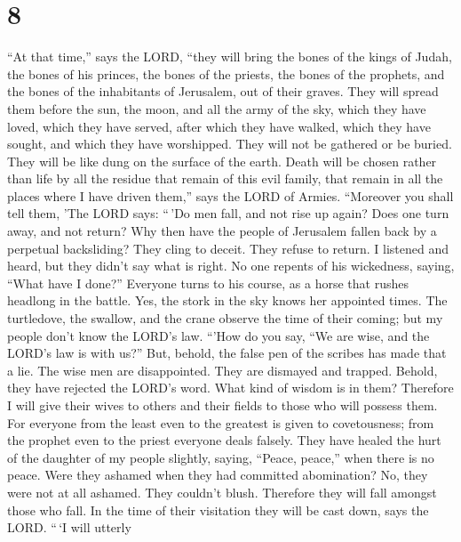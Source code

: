 \hypertarget{section-7}{%
\section{8}\label{section-7}}

 ``At that time,'' says the LORD, ``they will bring the
bones of the kings of Judah, the bones of his princes, the bones of the
priests, the bones of the prophets, and the bones of the inhabitants of
Jerusalem, out of their graves.  They will spread them
before the sun, the moon, and all the army of the sky, which they have
loved, which they have served, after which they have walked, which they
have sought, and which they have worshipped. They will not be gathered
or be buried. They will be like dung on the surface of the earth.
 Death will be chosen rather than life by all the residue
that remain of this evil family, that remain in all the places where I
have driven them,'' says the LORD of Armies.  ``Moreover
you shall tell them, 'The LORD says: ``\,'Do men fall, and not rise up
again? Does one turn away, and not return?  Why then have
the people of Jerusalem fallen back by a perpetual backsliding? They
cling to deceit. They refuse to return.  I listened and
heard, but they didn't say what is right. No one repents of his
wickedness, saying, ``What have I done?'' Everyone turns to his course,
as a horse that rushes headlong in the battle.  Yes, the
stork in the sky knows her appointed times. The turtledove, the swallow,
and the crane observe the time of their coming; but my people don't know
the LORD's law.  ``'How do you say, ``We are wise, and the
LORD's law is with us?'' But, behold, the false pen of the scribes has
made that a lie.  The wise men are disappointed. They are
dismayed and trapped. Behold, they have rejected the LORD's word. What
kind of wisdom is in them?  Therefore I will give their
wives to others and their fields to those who will possess them. For
everyone from the least even to the greatest is given to covetousness;
from the prophet even to the priest everyone deals falsely.
 They have healed the hurt of the daughter of my people
slightly, saying, ``Peace, peace,'' when there is no peace.
 Were they ashamed when they had committed abomination?
No, they were not at all ashamed. They couldn't blush. Therefore they
will fall amongst those who fall. In the time of their visitation they
will be cast down, says the LORD.  ``\,`I will utterly
